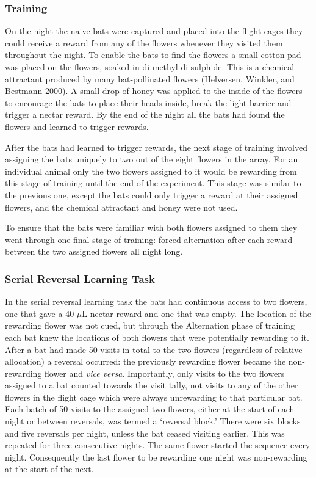 \documentclass[
]{article}
\begin{document}
\hypertarget{training}{%
\subsubsection{Training}\label{training}}

On the night the naive bats were captured and placed into the flight cages they could receive a reward from any of the flowers whenever they visited them throughout the night. To enable the bats to find the flowers a small cotton pad was placed on the flowers, soaked in di-methyl di-sulphide. This is a chemical attractant produced by many bat-pollinated flowers (Helversen, Winkler, and Bestmann 2000). A small drop of honey was applied to the inside of the flowers to encourage the bats to place their heads inside, break the light-barrier and trigger a nectar reward. By the end of the night all the bats had found the flowers and learned to trigger rewards.

After the bats had learned to trigger rewards, the next stage of training involved assigning the bats uniquely to two out of the eight flowers in the array. For an individual animal only the two flowers assigned to it would be rewarding from this stage of training until the end of the experiment. This stage was similar to the previous one, except the bats could only trigger a reward at their assigned flowers, and the chemical attractant and honey were not used.

To ensure that the bats were familiar with both flowers assigned to them they went through one final stage of training: forced alternation after each reward between the two assigned flowers all night long.

\hypertarget{serial-reversal-learning-task}{%
\subsubsection{Serial Reversal Learning Task}\label{serial-reversal-learning-task}}

In the serial reversal learning task the bats had continuous access to two flowers, one that gave a 40 \(\mu\)L nectar reward and one that was empty. The location of the rewarding flower was not cued, but through the Alternation phase of training each bat knew the locations of both flowers that were potentially rewarding to it. After a bat had made 50 visits in total to the two flowers (regardless of relative allocation) a reversal occurred: the previously rewarding flower became the non-rewarding flower and \emph{vice versa}. Importantly, only visits to the two flowers assigned to a bat counted towards the visit tally, not visits to any of the other flowers in the flight cage which were always unrewarding to that particular bat. Each batch of 50 visits to the assigned two flowers, either at the start of each night or between reversals, was termed a `reversal block.' There were six blocks and five reversals per night, unless the bat ceased visiting earlier. This was repeated for three consecutive nights. The same flower started the sequence every night. Consequently the last flower to be rewarding one night was non-rewarding at the start of the next.
\end{document}
